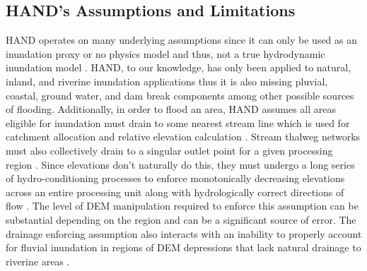 \documentclass[draft]{dependencies/agujournal2019}
\begin{document}
\subsection{HAND's Assumptions and Limitations}
\label{sssec:hand_assumptions_limitations}
%
HAND operates on many underlying assumptions since it can only be used as an inundation proxy or no physics model and thus, not a true hydrodynamic inundation model \cite{nobre2016hand,liu2016cybergis,liu2020height}.
HAND, to our knowledge, has only been applied to natural, inland, and riverine inundation applications thus it is also missing pluvial, coastal, ground water, and dam break components among other possible sources of flooding.
Additionally, in order to flood an area, HAND assumes all areas eligible for inundation must drain to some nearest stream line which is used for catchment allocation and relative elevation calculation \cite{nobre2016hand,nobre2011height,liu2016cybergis,liu2020height,maidment2017conceptual,garousi2019terrain,zheng2018river,zheng2018geoflood,johnson2019integrated,renno2008hand}.
Stream thalweg networks must also collectively drain to a singular outlet point for a given processing region \cite{nobre2016hand,zheng2018geoflood,renno2008hand}.
Since elevations don't naturally do this, they must undergo a long series of hydro-conditioning processes to enforce monotonically decreasing elevations across an entire processing unit along with hydrologically correct directions of flow \cite{nobre2016hand,nobre2011height,liu2016cybergis,liu2020height,donchyts2016global,renno2008hand}.
The level of DEM manipulation required to enforce this assumption can be substantial depending on the region and can be a significant source of error.
The drainage enforcing assumption also interacts with an inability to properly account for fluvial inundation in regions of DEM depressions that lack natural drainage to riverine areas \cite{nobre2016hand,renno2008hand}.
\end{document}
